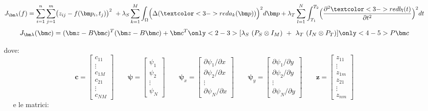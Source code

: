 \documentclass[landscape,9pt]{beamer}                           %
\begin{document}
\begin{frame}
{
\begin{multline*}
J_{\bm \lambda }(f)=\sum_{i=1}^n \sum_{j=1}^m \bigl( z_{ij} - f(\bm p_i,t_j) \bigr)^2 \ +\lambda_S  \sum_{k=1}^M \int_{\Omega} \Bigl( \Delta(  \textcolor<3->{red}{a_k(\bm p)}  ) \Bigr)^2 d \bm p + \lambda_T \sum_{l=1}^N\int_{T_1}^{T_2} \Bigl( \frac{\partial^2  \textcolor<3->{red}{b_l(t)}   }{\partial t ^2} \Bigr)^2 dt 
\end{multline*}
}
{
$$
J_{\bm \lambda }(\bm c) = (\bm z - B \bm c)^T (\bm z - B \bm c) + \bm c^T \only<2-3>{[\lambda_S\    (P_S \otimes I_M)   \ +\  \lambda_T\   (I_N \otimes P_T)]} \only<4-5>{P}\bm c
$$
}
{
dove:
$$
\bm{c} =
\begin{bmatrix}
c_{11}  \\
\vdots\\
c_{1M}  \\
c_{21}  \\
\vdots\\
c_{NM}
\end{bmatrix}
\qquad
\bm \psi =
\begin{bmatrix}
\psi_{1}  \\
\psi_{2}  \\
\vdots\\
\psi_{N}
\end{bmatrix}
\qquad
\bm \psi_x=  \begin{bmatrix}
\partial \psi_{1}/\partial x \\
\partial \psi_{2}/\partial x  \\
\vdots\\
\partial \psi_{N}/\partial x \end{bmatrix} 
\qquad
\bm \psi_y=  \begin{bmatrix}
\partial \psi_{1}/\partial y  \\
\partial \psi_{2}/\partial y  \\
\vdots\\
\partial \psi_{N}/\partial y\end{bmatrix}
\qquad
\bm z =
\begin{bmatrix}
z_{11}  \\
\vdots\\
z_{1m}  \\
z_{21}  \\
\vdots\\
z_{nm}
\end{bmatrix}
$$
\ \ 
\newline
e le matrici: 
\begin{itemize}

\end{itemize}}
\end{frame}
\end{document}
